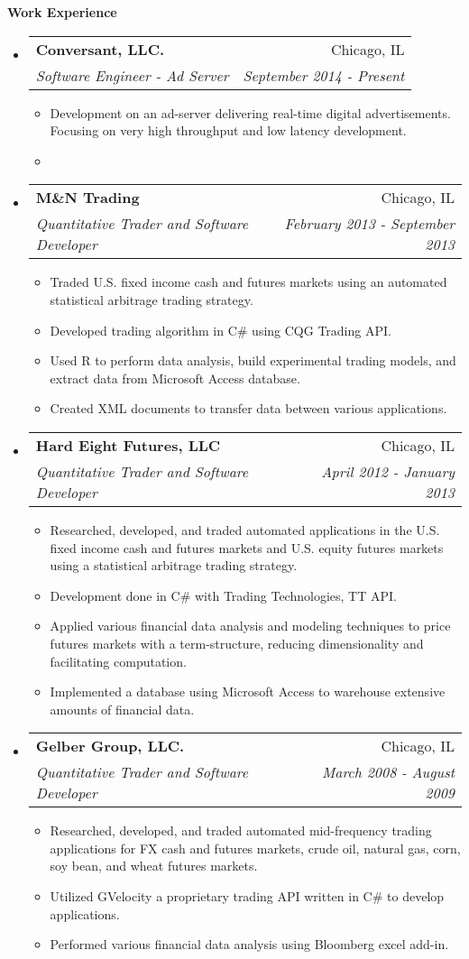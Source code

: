 \documentclass[letterpaper,11pt]{article}
\makeatletter
\newcommand{\resitem}[1]{\item #1 \vspace{-2pt}}
\newcommand{\resheading}[1]{{\large \colorbox{mygrey}{\begin{minipage}{\textwidth}{\textbf{#1 \vphantom{p\^{E}}}}\end{minipage}}}}
\newcommand{\ressubheading}[4]{
\begin{tabular*}{7.0in}{l@{\extracolsep{\fill}}r}
		\textbf{#1} & #2 \\
		\textit{#3} & \textit{#4} \\
\end{tabular*}\vspace{-6pt}}
\makeatother
\begin{document}
\resheading{Work Experience}
\begin{itemize}
\item
	\ressubheading{Conversant, LLC.}{Chicago, IL}{Software Engineer - Ad Server}{September 2014 - Present}
	\begin{itemize}
		\resitem{Development on an ad-server delivering real-time digital advertisements.  Focusing on very high throughput and low latency development. }
		\resitem{  }
	\end{itemize}
\item
	\ressubheading{M\&N Trading}{Chicago, IL}{Quantitative Trader and Software Developer}{February 2013 - September 2013}
	\begin{itemize}
		\resitem{Traded U.S. fixed income cash and futures markets using an automated statistical arbitrage 
   trading strategy.}
		\resitem{Developed trading algorithm in C\# using CQG Trading API.}
		\resitem{Used R to perform data analysis, build experimental trading models, and extract data from 
   Microsoft Access database.}
		\resitem{Created XML documents to transfer data between various applications. }
	\end{itemize}
\item
	\ressubheading{Hard Eight Futures, LLC}{Chicago, IL}{Quantitative Trader and Software Developer}{April 2012 - January 2013}
	\begin{itemize}
		\resitem{Researched, developed, and traded automated applications in the U.S. fixed income cash and 
   futures markets and U.S. equity futures markets using a statistical arbitrage trading strategy.}
		\resitem{Development done in C\# with Trading Technologies, TT API.}
		\resitem{Applied various financial data analysis and modeling techniques to price futures markets with 
   a term-structure, reducing dimensionality and facilitating computation.}
        \resitem{Implemented a database using Microsoft Access to warehouse extensive amounts of financial data.}
	\end{itemize}
\item
	\ressubheading{Gelber Group, LLC.}{Chicago, IL}{Quantitative Trader and Software Developer}{March 2008 - August 2009}
	\begin{itemize}
		\resitem{Researched, developed, and traded automated mid-frequency trading applications for FX cash and 
   futures markets, crude oil, natural gas, corn, soy bean, and wheat futures markets.}
		\resitem{Utilized GVelocity a proprietary trading API written in C\# to develop applications.}
		\resitem{Performed various financial data analysis using Bloomberg excel add-in.}
	\end{itemize}


\end{itemize}
\end{document}
